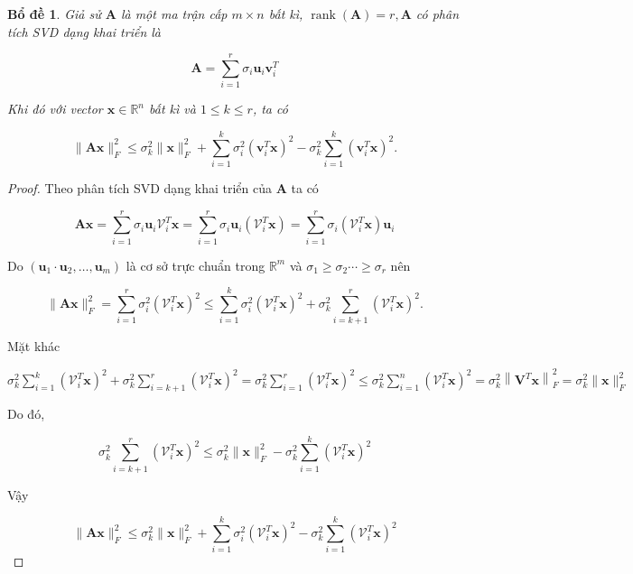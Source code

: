 \documentclass[14pt,oneside,a4paper]{report}
\newtheorem{bd}{Bổ đề} [section]
\numberwithin{equation}{section}
\begin{document}
\begin{bd} \label{bode} Giả sử $\mathbf{A}$ là một ma trận cấp $m \times n$ bất kì, $\operatorname{rank}(\mathbf{A})=r, \mathbf{A}$ có phân tích SVD dạng khai triển là

$$
\mathbf{A}=\sum_{i=1}^{r} \sigma_{i} \mathbf{u}_{i} \mathbf{v}_{i}^{T}
$$

Khi đó với vector $\mathbf{x} \in \mathbb{R}^{n}$ bất kì và $1 \leqslant k \leqslant r$, ta có

$$
\|\mathbf{A} \mathbf{x}\|_{F}^{2} \leqslant \sigma_{k}^{2}\|\mathbf{x}\|_{F}^{2}+\sum_{i=1}^{k} \sigma_{i}^{2}\left(\mathbf{v}_{i}^{T} \mathbf{x}\right)^{2}-\sigma_{k}^{2} \sum_{i=1}^{k}\left(\mathbf{v}_{i}^{T} \mathbf{x}\right)^{2} .
$$
\end{bd}
\begin{proof}
Theo phân tích SVD dạng khai triển của $\mathbf{A}$ ta có

$$
\mathbf{A} \mathbf{x}=\sum_{i=1}^{r} \sigma_{i} \mathbf{u}_{i} \mathcal{V}_{i}^{T} \mathbf{x}=\sum_{i=1}^{r} \sigma_{i} \mathbf{u}_{i}\left(\mathcal{V}_{i}^{T} \mathbf{x}\right)=\sum_{i=1}^{r} \sigma_{i}\left(\mathcal{V}_{i}^{T} \mathbf{x}\right) \mathbf{u}_{i}
$$

Do $\left(\mathbf{u}_{1} \cdot \mathbf{u}_{2}, \ldots, \mathbf{u}_{m}\right)$ là cơ sở trực chuẩn trong $\mathbb{R}^{m}$ và $\sigma_{1} \geqslant \sigma_{2} \cdots \geqslant \sigma_{r}$ nên

$$
\|\mathbf{A} \mathbf{x}\|_{F}^{2}=\sum_{i=1}^{r} \sigma_{i}^{2}\left(\mathcal{V}_{i}^{T} \mathbf{x}\right)^{2} \leqslant \sum_{i=1}^{k} \sigma_{i}^{2}\left(\mathcal{V}_{i}^{T} \mathbf{x}\right)^{2}+\sigma_{k}^{2} \sum_{i=k+1}^{r}\left(\mathcal{V}_{i}^{T} \mathbf{x}\right)^{2} .
$$

Mặt khác

$\sigma_{k}^{2} \sum_{i=1}^{k}\left(\mathcal{V}_{i}^{T} \mathbf{x}\right)^{2}+\sigma_{k}^{2} \sum_{i=k+1}^{r}\left(\mathcal{V}_{i}^{T} \mathbf{x}\right)^{2}=\sigma_{k}^{2} \sum_{i=1}^{r}\left(\mathcal{V}_{i}^{T} \mathbf{x}\right)^{2} \leqslant \sigma_{k}^{2} \sum_{i=1}^{n}\left(\mathcal{V}_{i}^{T} \mathbf{x}\right)^{2}=\sigma_{k}^{2}\left\|\mathbf{V}^{T} \mathbf{x}\right\|_{F}^{2}=\sigma_{k}^{2}\|\mathbf{x}\|_{F}^{2}$

Do đó,

$$
\sigma_{k}^{2} \sum_{i=k+1}^{r}\left(\mathcal{V}_{i}^{T} \mathbf{x}\right)^{2} \leqslant \sigma_{k}^{2}\|\mathbf{x}\|_{F}^{2}-\sigma_{k}^{2} \sum_{i=1}^{k}\left(\mathcal{V}_{i}^{T} \mathbf{x}\right)^{2}
$$

Vậy

$$
\|\mathbf{A} \mathbf{x}\|_{F}^{2} \leqslant \sigma_{k}^{2}\|\mathbf{x}\|_{F}^{2}+\sum_{i=1}^{k} \sigma_{i}^{2}\left(\mathcal{V}_{i}^{T} \mathbf{x}\right)^{2}-\sigma_{k}^{2} \sum_{i=1}^{k}\left(\mathcal{V}_{i}^{T} \mathbf{x}\right)^{2}
$$
\end{proof}
\end{document}
